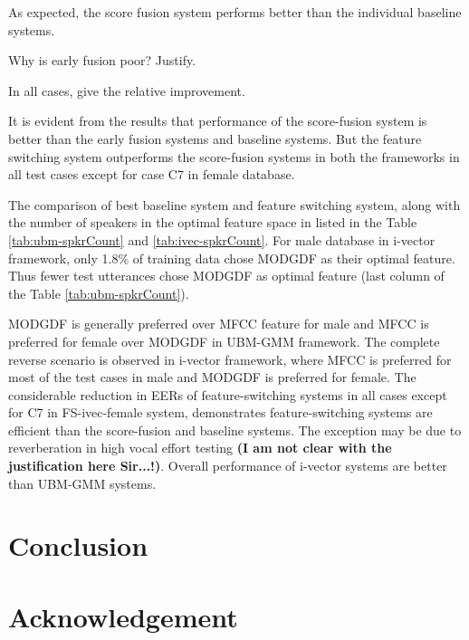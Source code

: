 \documentclass{article}
\begin{document}
As expected, the score fusion system performs better than the individual
baseline systems. 

Why is early fusion poor? Justify.

In all cases, give the relative improvement.

It is evident from the results that performance of the score-fusion system is better than the early fusion systems and baseline systems. But the feature switching system outperforms the score-fusion systems in both the frameworks in all test cases except for case C7 in female database.

The comparison of best baseline system and feature switching system, along with
the number of speakers in the optimal feature space in listed in the Table
\ref{tab:ubm-spkrCount} and \ref{tab:ivec-spkrCount}. For male database in
i-vector framework, only 1.8\% of training data chose MODGDF as their optimal
feature. Thus fewer test utterances chose MODGDF as optimal feature (last column
of the Table \ref{tab:ubm-spkrCount}). 

\vspace{0.25cm}
MODGDF is generally preferred over MFCC feature for male and MFCC is preferred for female over MODGDF in UBM-GMM framework. The complete reverse scenario is observed in i-vector framework, where MFCC is preferred for most of the test cases in male and MODGDF is preferred for female. The considerable reduction in EERs of feature-switching systems in all cases except for C7 in FS-ivec-female system, demonstrates feature-switching systems are efficient than the score-fusion and baseline systems. The exception may be due to reverberation in high vocal effort testing \cite{vocalEffort} {\bf (I am not clear with the justification here Sir...!)}. Overall performance of i-vector systems are better than UBM-GMM systems.  

\vspace{0.25cm}
\section{Conclusion}
\label{sec:conclude}
\vspace{0.25cm}
\section{Acknowledgement}
\label{sec:ack}


\clearpage 



\end{document}

